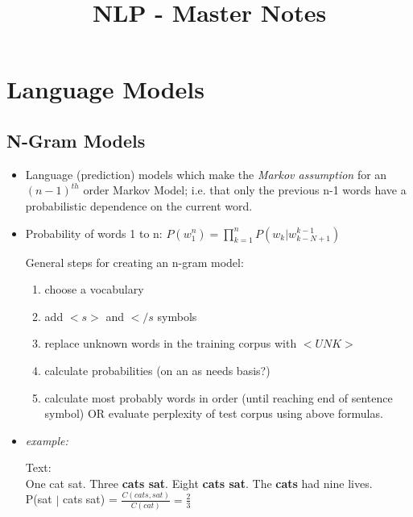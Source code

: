 \documentclass[]{article}
\title{NLP - Master Notes}
\begin{document}
	\maketitle
	
	\section{Language Models}
	
	\subsection{N-Gram Models}
	
	\begin{itemize}
	
		\item Language (prediction) models which make the \textit{Markov assumption} for an $(n-1)^{th}$ order Markov Model; i.e. that only the previous n-1 words have a probabilistic dependence on the current word.
		
		\item Probability of words 1 to n: $P(w_1^n) = \prod_{k=1}^{n}P(w_k | w_{k-N+1}^{k-1})$
		
		General steps for creating an n-gram model:		
		\begin{enumerate}
			\item choose a vocabulary 
			\item add $<s>$ and $</s$ symbols 
			\item replace unknown words in the training corpus with $<UNK>$ 
			\item calculate probabilities (on an as needs basis?)
			\item calculate most probably words in order (until reaching end of sentence symbol) OR evaluate perplexity of test corpus using above formulas.
			
		\end{enumerate}
		
		\item \textit{example:} 
		
		\begin{center}
			Text: \\
			One cat sat. Three \textbf{cats sat}. Eight \textbf{cats sat}. The \textbf{cats} had nine lives. 	\\
			
			P(sat $|$ cats sat) = $\frac{C(cats,sat)}{C(cat)} = \frac{2}{3}$
			
		\end{center}
		

\end{itemize}
\end{document}

